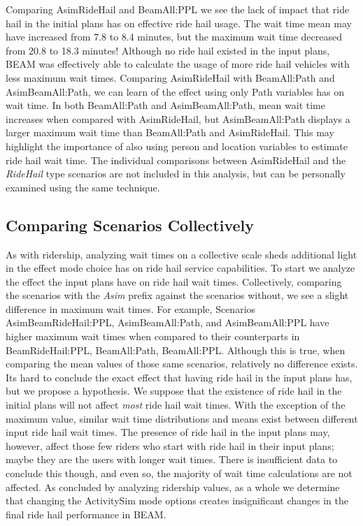 \documentclass[12pt, oneside, openright]{byuthesis}
\begin{document}
Comparing AsimRideHail and BeamAll:PPL we see the lack of impact that ride hail in the initial plans has on effective ride hail usage. The wait time mean may have increased from 7.8 to 8.4 minutes, but the maximum wait time decreased from 20.8 to 18.3 minutes! Although no ride hail existed in the input plans, BEAM was effectively able to calculate the usage of more ride hail vehicles with less maximum wait times. Comparing AsimRideHail with BeamAll:Path and AsimBeamAll:Path, we can learn of the effect using only Path variables has on wait time. In both BeamAll:Path and AsimBeamAll:Path, mean wait time increases when compared with AsimRideHail, but AsimBeamAll:Path displays a larger maximum wait time than BeamAll:Path and AsimRideHail. This may highlight the importance of also using person and location variables to estimate ride hail wait time. The individual comparisons between AsimRideHail and the \emph{RideHail} type scenarios are not included in this analysis, but can be personally examined using the same technique.

\hypertarget{comparing-scenarios-collectively}{%
\subsection{Comparing Scenarios Collectively}\label{comparing-scenarios-collectively}}

As with ridership, analyzing wait times on a collective scale sheds additional light in the effect mode choice has on ride hail service capabilities. To start we analyze the effect the input plans have on ride hail wait times. Collectively, comparing the scenarios with the \emph{Asim} prefix against the scenarios without, we see a slight difference in maximum wait times. For example, Scenarios AsimBeamRideHail:PPL, AsimBeamAll:Path, and AsimBeamAll:PPL have higher maximum wait times when compared to their counterparts in BeamRideHail:PPL, BeamAll:Path, BeamAll:PPL. Although this is true, when comparing the mean values of those same scenarios, relatively no difference exists. Its hard to conclude the exact effect that having ride hail in the input plans has, but we propose a hypothesis. We suppose that the existence of ride hail in the initial plans will not affect \emph{most} ride hail wait times. With the exception of the maximum value, similar wait time distributions and means exist between different input ride hail wait times. The presence of ride hail in the input plans may, however, affect those few riders who start with ride hail in their input plans; maybe they are the users with longer wait times. There is insufficient data to conclude this though, and even so, the majority of wait time calculations are not affected. As concluded by analyzing ridership values, as a whole we determine that changing the ActivitySim mode options creates insignificant changes in the final ride hail performance in BEAM.
\end{document}
